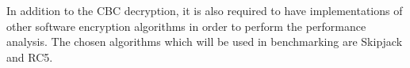  


In addition to the CBC decryption, it is also required to have implementations of other software encryption algorithms in order to perform the performance analysis. The chosen 
algorithms which will be used in benchmarking are Skipjack and RC5.
